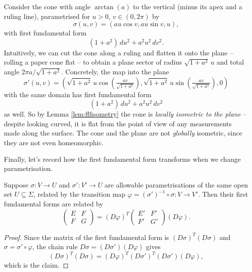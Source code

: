 \documentclass[a4paper]{scrartcl}
\begin{document}
\begin{example}\label{ex:cone}
    Consider the cone with angle $\arctan(a)$ to the vertical (minus its apex and a ruling line), parametrised for $u > 0$, $v \in (0, 2\pi)$ by
    $$
    \sigma(u, v) = (a u \cos v, au\sin v, u),
    $$
    with first fundamental form
    $$
    (1 + a^2)\, du^2 + a^2 u^2 \, dv^2.
    $$
    Intuitively, we can cut the cone along a ruling and flatten it onto the plane -- rolling a paper cone flat -- to obtain a plane sector of radius $\sqrt{1 + a^2}\,u$ and total angle $2\pi a / \sqrt{1 + a^2}$. Concretely, the map into the plane
    $$
    \sigma'(u, v) = \left(\sqrt{1 + a^2}\, u \cos\left(\tfrac{a v}{\sqrt{1 + a^2}}\right), \sqrt{1 + a^2} \, u \sin\left(\tfrac{av}{\sqrt{1+a^2}}\right), 0\right)
    $$
    with the same domain has first fundamental form
    $$
    (1 + a^2) \, du^2 + a^2 u^2 \, dv^2
    $$
    as well. So by Lemma \ref{lem:fffisometry} the cone is \emph{locally isometric to the plane} -- despite looking curved, it is flat from the point of view of any measurements made along the surface. The cone and the plane are not \emph{globally} isometric, since they are not even homeomorphic.
\end{example}

Finally, let's record how the first fundamental form transforms when we change parametrisation.

\begin{lemma}
    Suppose $\sigma: V \rightarrow U$ and $\sigma': V' \rightarrow U$ are allowable parametrisations of the same open set $U \subseteq \Sigma$, related by the transition map $\varphi = (\sigma')^{-1} \circ \sigma : V \rightarrow V'$. Then their first fundamental forms are related by
    $$
    \begin{pmatrix} E & F \\ F & G\end{pmatrix} = (D\varphi)^T \begin{pmatrix} E' & F' \\ F' & G' \end{pmatrix} (D\varphi).
    $$
\end{lemma}
\begin{proof}
    Since the matrix of the first fundamental form is $(D\sigma)^T(D\sigma)$ and $\sigma = \sigma' \circ \varphi$, the chain rule $D\sigma = (D\sigma')( D\varphi)$ gives
    $$
    (D\sigma)^T (D\sigma) = (D\varphi)^T (D\sigma')^T (D\sigma') (D\varphi),
    $$
    which is the claim.
\end{proof}
\end{document}
